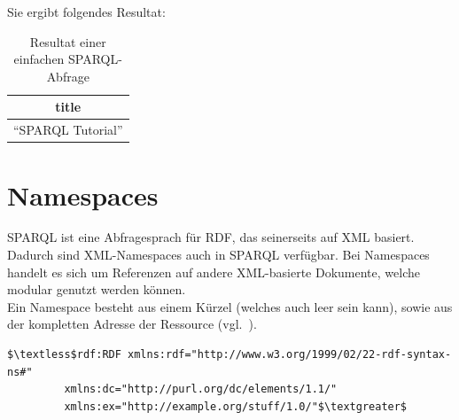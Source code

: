 Sie ergibt folgendes Resultat:
\noindent\hspace*{15mm}
\begin{table}[h]
    \centering
    \begin{tabular}{|l|}
        \hline
        \multicolumn{1}{|c|}{\textbf{title}} \\ \hline
        ``SPARQL Tutorial''                    \\ \hline
    \end{tabular}
    \caption{Resultat einer einfachen SPARQL-Abfrage\protect\footnotemark}
\end{table}

\section{Namespaces}
\label{sec:sparql_namespaces}

SPARQL ist eine Abfragesprach für RDF, das seinerseits auf XML basiert. Dadurch sind XML-Namespaces auch in SPARQL verfügbar. Bei Namespaces handelt es sich um Referenzen auf andere XML-basierte Dokumente, welche modular genutzt werden können.\\
Ein Namespace besteht aus einem Kürzel (welches auch leer sein kann), sowie aus der kompletten Adresse der Ressource (vgl.~\cite[2.1 Introduction]{w3rdf_syntax}).

\begin{lstlisting}
$\textless$rdf:RDF xmlns:rdf="http://www.w3.org/1999/02/22-rdf-syntax-ns#"
         xmlns:dc="http://purl.org/dc/elements/1.1/"
         xmlns:ex="http://example.org/stuff/1.0/"$\textgreater$
\end{lstlisting}

